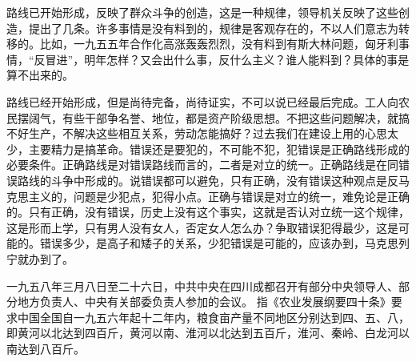 路线已开始形成，反映了群众斗争的创造，这是一种规律，领导机关反映了这些创造，提出了几条。许多事情是没有料到的，规律是客观存在的，不以人们意志为转移的。比如，一九五五年合作化高涨轰轰烈烈，没有料到有斯大林问题，匈牙利事情，“反冒进”，明年怎样？又会出什么事，反什么主义？谁人能料到？具体的事是算不出来的。

路线已经开始形成，但是尚待完备，尚待证实，不可以说已经最后完成。工人向农民摆阔气，有些干部争名誉、地位，都是资产阶级思想。不把这些问题解决，就搞不好生产，不解决这些相互关系，劳动怎能搞好？过去我们在建设上用的心思太少，主要精力是搞革命。错误还是要犯的，不可能不犯，犯错误是正确路线形成的必要条件。正确路线是对错误路线而言的，二者是对立的统一。正确路线是在同错误路线的斗争中形成的。说错误都可以避免，只有正确，没有错误这种观点是反马克思主义的，问题是少犯点，犯得小点。正确与错误是对立的统一，难免论是正确的。只有正确，没有错误，历史上没有这个事实，这就是否认对立统一这个规律，这是形而上学，只有男人没有女人，否定女人怎么办？争取错误犯得最少，这是可能的。错误多少，是高子和矮子的关系，少犯错误是可能的，应该办到，马克思列宁就办到了。

\begin{maonote}
一九五八年三月八日至二十六日，中共中央在四川成都召开有部分中央领导人、部分地方负责人、中央有关部委负责人参加的会议。
指《农业发展纲要四十条》要求中国全国自一九五六年起十二年内，粮食亩产量不同地区分别达到四、五、八，即黄河以北达到四百斤，黄河以南、淮河以北达到五百斤，淮河、秦岭、白龙河以南达到八百斤。
\end{maonote}

